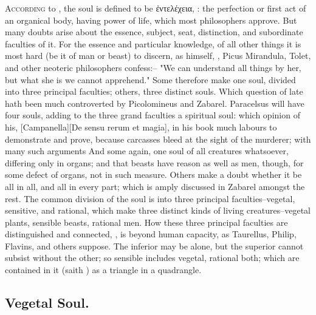 \lettrine{A}{ccording} to \Aristotle{}, the soul is defined
to be \textgreek{ἐντελέχεια}, : the perfection or first act of an organical body,
having power of life, which most philosophers approve. But
many doubts arise about the essence, subject, seat, distinction, and
subordinate faculties of it. For the essence and particular knowledge, of all
other things it is most hard (be it of man or beast) to discern, as
\Aristotle{} himself, \Tully{},
Picus Mirandula, Tolet, and other
neoteric philosophers confess:-- "We can understand all
things by her, but what she is we cannot apprehend." Some therefore make one
soul, divided into three principal faculties; others, three distinct souls.
Which question of late hath been much controverted by Picolomineus and Zabarel.
Paracelsus will have four souls, adding to the three grand
faculties a spiritual soul: which opinion of his,
[Campanella][\textlatin{De sensu rerum et magia}], in his
book  much labours to
demonstrate and prove, because carcasses bleed at the sight of the murderer;
with many such arguments And some again, one soul of all
creatures whatsoever, differing only in organs; and that beasts have reason as
well as men, though, for some defect of organs, not in such measure. Others
make a doubt whether it be all in all, and all in every part; which is amply
discussed in Zabarel amongst the rest. The common division
of the soul is into three principal faculties--vegetal, sensitive, and
rational, which make three distinct kinds of living creatures--vegetal plants,
sensible beasts, rational men. How these three principal faculties are
distinguished and connected, , is beyond
human capacity, as Taurellus, Philip, Flavins, and others
suppose. The inferior may be alone, but the superior cannot subsist without the
other; so sensible includes vegetal, rational both; which are contained in it
(saith \Aristotle{})  as a triangle in a quadrangle.

\subsection{Vegetal Soul.}


